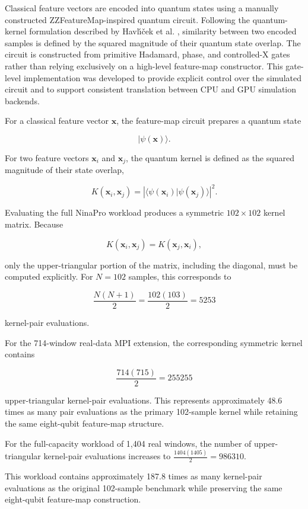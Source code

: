 \documentclass[pdflatex,sn-mathphys-num]{sn-jnl}%
\theoremstyle{thmstyleone}%
\theoremstyle{thmstyletwo}%
\theoremstyle{thmstylethree}%
\begin{document}
Classical feature vectors are encoded into quantum states using a manually
constructed ZZFeatureMap-inspired quantum circuit. Following the quantum-kernel
formulation described by Havl\'{\i}\v{c}ek et al. \cite{havlicek2019}, similarity
between two encoded samples is defined by the squared magnitude of their quantum
state overlap. The circuit is constructed from primitive
Hadamard, phase, and controlled-X gates rather than relying exclusively on a
high-level feature-map constructor. This gate-level implementation was developed
to provide explicit control over the simulated circuit and to support consistent
translation between CPU and GPU simulation backends.

For a classical feature vector $\mathbf{x}$, the feature-map circuit prepares a
quantum state

\[
|\psi(\mathbf{x})\rangle.
\]

For two feature vectors $\mathbf{x}_i$ and $\mathbf{x}_j$, the quantum kernel is
defined as the squared magnitude of their state overlap,

\[
K(\mathbf{x}_i,\mathbf{x}_j)
=
\left|
\langle
\psi(\mathbf{x}_i)
|
\psi(\mathbf{x}_j)
\rangle
\right|^2.
\]

Evaluating the full NinaPro workload produces a symmetric
$102\times102$ kernel matrix. Because

\[
K(\mathbf{x}_i,\mathbf{x}_j)
=
K(\mathbf{x}_j,\mathbf{x}_i),
\]

only the upper-triangular portion of the matrix, including the diagonal, must be
computed explicitly. For $N=102$ samples, this corresponds to

\[
\frac{N(N+1)}{2}
=
\frac{102(103)}{2}
=
5253
\]

kernel-pair evaluations.

For the 714-window real-data MPI extension, the corresponding symmetric kernel
contains

\[
\frac{714(715)}{2}
=
255255
\]

upper-triangular kernel-pair evaluations. This represents approximately
48.6 times as many pair evaluations as the primary 102-sample kernel while
retaining the same eight-qubit feature-map structure.

For the full-capacity workload of 1,404 real windows, the number of
upper-triangular kernel-pair evaluations increases to \(\frac{1404(1405)}{2} = 986310.\)

This workload contains approximately 187.8 times as many kernel-pair
evaluations as the original 102-sample benchmark while preserving the same
eight-qubit feature-map construction.
\end{document}
